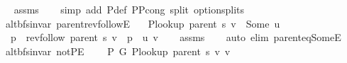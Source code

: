 \begin{isabellebody}
\endisataginvisible
{\isafoldinvisible}%
%
\isadeliminvisible
\isanewline
%
\endisadeliminvisible
%
\isadelimproof
\ \ %
\endisadelimproof
%
\isatagproof
{}\isamarkupfalse%
\ assms\isanewline
\ \ \isamarkupfalse%
\ {\isacharparenleft}{\kern0pt}simp\ add{\isacharcolon}{\kern0pt}\ P{\isacharprime}{\kern0pt}{\isacharunderscore}{\kern0pt}def\ P{\isacharunderscore}{\kern0pt}P{\isacharprime}{\kern0pt}{\isacharprime}{\kern0pt}{\isacharunderscore}{\kern0pt}cong\ split{\isacharcolon}{\kern0pt}\ option{\isachardot}{\kern0pt}splits{\isacharparenleft}{\kern0pt}{}{\isacharparenright}{\kern0pt}{\isacharparenright}{\kern0pt}%
\endisatagproof
{\isafoldproof}%
%
\isadelimproof
\isanewline
%
\endisadelimproof
%
\isadeliminvisible
\isanewline
%
\endisadeliminvisible
%
\isataginvisible
{}\isamarkupfalse%
\ {\isacharparenleft}{\kern0pt}\ alt{\isacharunderscore}{\kern0pt}bfs{\isacharunderscore}{\kern0pt}invar{\isacharparenright}{\kern0pt}\ parent{\isacharunderscore}{\kern0pt}rev{\isacharunderscore}{\kern0pt}followE{\isacharcolon}{\kern0pt}\isanewline
\ \ \ {\isachardoublequoteopen}P{\isacharunderscore}{\kern0pt}lookup\ {\isacharparenleft}{\kern0pt}parent\ s{\isacharparenright}{\kern0pt}\ v\ {\isacharequal}{\kern0pt}\ Some\ u{\isachardoublequoteclose}\isanewline
\ \ \ p\ \ {\isachardoublequoteopen}rev{\isacharunderscore}{\kern0pt}follow\ {\isacharparenleft}{\kern0pt}parent\ s{\isacharparenright}{\kern0pt}\ v\ {\isacharequal}{\kern0pt}\ p\ {\isacharat}{\kern0pt}\ {\isacharbrackleft}{\kern0pt}u{\isacharcomma}{\kern0pt}\ v{\isacharbrackright}{\kern0pt}{\isachardoublequoteclose}%
\endisataginvisible
{\isafoldinvisible}%
%
\isadeliminvisible
\isanewline
%
\endisadeliminvisible
%
\isadelimproof
\ \ %
\endisadelimproof
%
\isatagproof
{}\isamarkupfalse%
\ assms\isanewline
\ \ \isamarkupfalse%
\ {\isacharparenleft}{\kern0pt}auto\ elim{\isacharcolon}{\kern0pt}\ parent{\isacharunderscore}{\kern0pt}eq{\isacharunderscore}{\kern0pt}SomeE{\isacharparenright}{\kern0pt}%
\endisatagproof
{\isafoldproof}%
%
\isadelimproof
\isanewline
%
\endisadelimproof
%
\isadeliminvisible
\isanewline
%
\endisadeliminvisible
%
\isataginvisible
{}\isamarkupfalse%
\ {\isacharparenleft}{\kern0pt}\ alt{\isacharunderscore}{\kern0pt}bfs{\isacharunderscore}{\kern0pt}invar{\isacharparenright}{\kern0pt}\ not{\isacharunderscore}{\kern0pt}P{\isacharprime}{\kern0pt}E{\isacharcolon}{\kern0pt}\isanewline
\ \ \ {\isachardoublequoteopen}{\isasymnot}\ P{\isacharprime}{\kern0pt}\ G{}\ {\isacharparenleft}{\kern0pt}P{\isacharunderscore}{\kern0pt}lookup\ {\isacharparenleft}{\kern0pt}parent\ s{\isacharparenright}{\kern0pt}\ v{\isacharparenright}{\kern0pt}\ v{\isachardoublequoteclose}\isanewline

\end{isabellebody}
